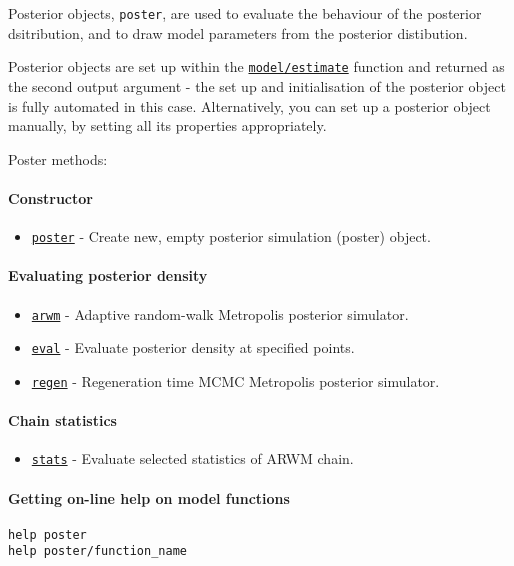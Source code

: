 

	Posterior objects, \texttt{poster}, are used to evaluate the behaviour
of the posterior dsitribution, and to draw model parameters from the
posterior distibution.

Posterior objects are set up within the
\href{model/estimate}{\texttt{model/estimate}} function and returned as
the second output argument - the set up and initialisation of the
posterior object is fully automated in this case. Alternatively, you can
set up a posterior object manually, by setting all its properties
appropriately.

Poster methods:

\paragraph{Constructor}\label{constructor}

\begin{itemize}
\itemsep1pt\parskip0pt
\item
  \href{poster/poster}{\texttt{poster}} - Create new, empty posterior
  simulation (poster) object.
\end{itemize}

\paragraph{Evaluating posterior
density}\label{evaluating-posterior-density}

\begin{itemize}
\itemsep1pt\parskip0pt
\item
  \href{poster/arwm}{\texttt{arwm}} - Adaptive random-walk Metropolis
  posterior simulator.
\item
  \href{poster/eval}{\texttt{eval}} - Evaluate posterior density at
  specified points.
\item
  \href{poster/regen}{\texttt{regen}} - Regeneration time MCMC
  Metropolis posterior simulator.
\end{itemize}

\paragraph{Chain statistics}\label{chain-statistics}

\begin{itemize}
\itemsep1pt\parskip0pt
\item
  \href{poster/stats}{\texttt{stats}} - Evaluate selected statistics of
  ARWM chain.
\end{itemize}

\paragraph{Getting on-line help on model
functions}\label{getting-on-line-help-on-model-functions}

\begin{verbatim}
help poster
help poster/function_name
\end{verbatim}



